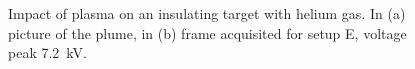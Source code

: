 \begin{figure}
 \centering
 \hfill
 \caption{Impact of plasma on an insulating target with helium gas. In (a) picture of the plume, in (b) frame acquisited for setup E, voltage peak \SI{7.2}{\kilo\volt}.}
 \label{fig:elio_ins}
\end{figure}


